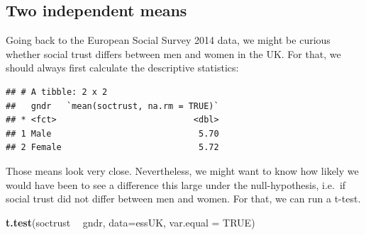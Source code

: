 \documentclass[
]{book}
\newenvironment{Shaded}{\begin{snugshade}}{\end{snugshade}}
\newcommand{\DataTypeTok}[1]{\textcolor[rgb]{0.13,0.29,0.53}{#1}}
\newcommand{\DecValTok}[1]{\textcolor[rgb]{0.00,0.00,0.81}{#1}}
\newcommand{\KeywordTok}[1]{\textcolor[rgb]{0.13,0.29,0.53}{\textbf{#1}}}
\newcommand{\NormalTok}[1]{#1}
\newcommand{\OperatorTok}[1]{\textcolor[rgb]{0.81,0.36,0.00}{\textbf{#1}}}
\newcommand{\OtherTok}[1]{\textcolor[rgb]{0.56,0.35,0.01}{#1}}
\newcommand{\StringTok}[1]{\textcolor[rgb]{0.31,0.60,0.02}{#1}}
\begin{document}
\hypertarget{two-independent-means}{%
\subsection{Two independent means}\label{two-independent-means}}

Going back to the European Social Survey 2014 data, we might be curious whether social trust differs between men and women in the UK. For that, we should always first calculate the descriptive statistics:

\begin{Shaded}
\end{Shaded}

\begin{verbatim}
## # A tibble: 2 x 2
##   gndr   `mean(soctrust, na.rm = TRUE)`
## * <fct>                           <dbl>
## 1 Male                             5.70
## 2 Female                           5.72
\end{verbatim}

Those means look very close. Nevertheless, we might want to know how likely we would have been to see a difference this large under the null-hypothesis, i.e.~if social trust did not differ between men and women. For that, we can run a t-test.

\begin{Shaded}
\begin{Highlighting}[]
\KeywordTok{t.test}\NormalTok{(soctrust }\OperatorTok{~}\StringTok{ }\NormalTok{gndr, }\DataTypeTok{data=}\NormalTok{essUK, }\DataTypeTok{var.equal =} \OtherTok{TRUE}\NormalTok{)}
\end{Highlighting}
\end{Shaded}
\end{document}
